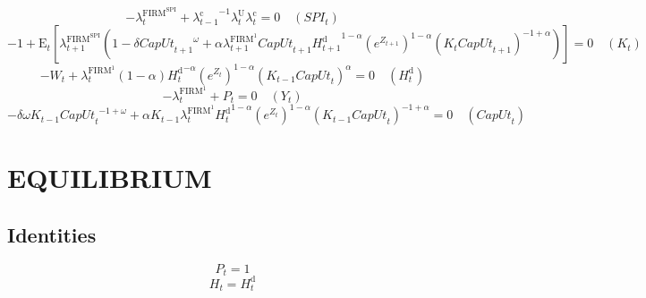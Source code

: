 \begin{equation}
-\lambda^{\mathrm{FIRM}^{\mathrm{SPI}}}_{t} + {\lambda^{\mathrm{c}}_{t-1}}^{-1} {\lambda^{\mathrm{U}}_{t}} {\lambda^{\mathrm{c}}_{t}} = 0
 \quad \left({S\!P\!I}_{t}\right)
\end{equation}
\begin{equation}
-1 + \mathrm{E}_{t}\left[{\lambda^{\mathrm{FIRM}^{\mathrm{SPI}}}_{t+1}} \left(1 - {\delta} {{{C\!a\!p\!U\!t}_{t+1}}^{\omega}} + {\alpha} {\lambda^{\mathrm{FIRM}^{\mathrm{1}}}_{t+1}} {{C\!a\!p\!U\!t}_{t+1}} {{H^{\mathrm{d}}_{t+1}}^{1 - \alpha}} {\left(e^{Z_{t+1}}\right)^{1 - \alpha}} {\left({K_{t}} {{C\!a\!p\!U\!t}_{t+1}}\right)^{-1 + \alpha}}\right)\right] = 0
 \quad \left(K_{t}\right)
\end{equation}
\begin{equation}
-W_{t} + {\lambda^{\mathrm{FIRM}^{\mathrm{1}}}_{t}} \left(1 - \alpha\right) {{H^{\mathrm{d}}_{t}}^{-\alpha}} {\left(e^{Z_{t}}\right)^{1 - \alpha}} {\left({K_{t-1}} {{C\!a\!p\!U\!t}_{t}}\right)^{\alpha}} = 0
 \quad \left(H^{\mathrm{d}}_{t}\right)
\end{equation}
\begin{equation}
-\lambda^{\mathrm{FIRM}^{\mathrm{1}}}_{t} + P_{t} = 0
 \quad \left(Y_{t}\right)
\end{equation}
\begin{equation}
-{\delta} {\omega} {K_{t-1}} {{{C\!a\!p\!U\!t}_{t}}^{-1 + \omega}} + {\alpha} {K_{t-1}} {\lambda^{\mathrm{FIRM}^{\mathrm{1}}}_{t}} {{H^{\mathrm{d}}_{t}}^{1 - \alpha}} {\left(e^{Z_{t}}\right)^{1 - \alpha}} {\left({K_{t-1}} {{C\!a\!p\!U\!t}_{t}}\right)^{-1 + \alpha}} = 0
 \quad \left({C\!a\!p\!U\!t}_{t}\right)
\end{equation}




\section{EQUILIBRIUM}

\subsection{Identities}

\begin{equation}
P_{t} = 1
\end{equation}
\begin{equation}
H_{t} = H^{\mathrm{d}}_{t}
\end{equation}




